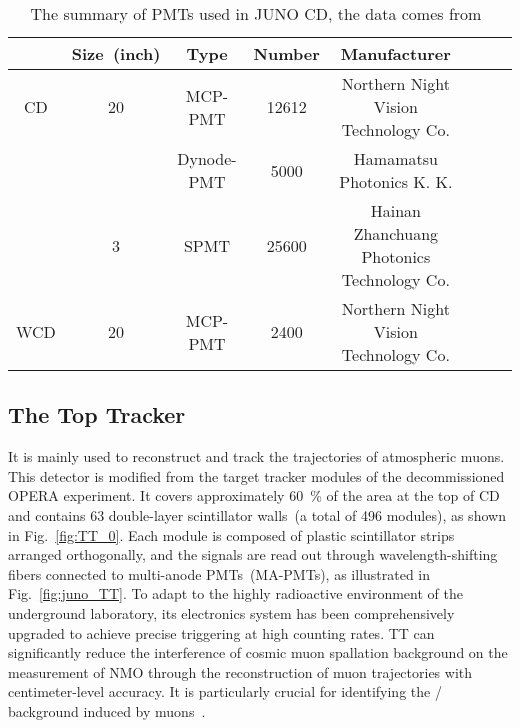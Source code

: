 \begin{table}[htbp]
	\centering %
	\caption{The summary of PMTs used in JUNO CD, the data comes from~\cite{muon207,PMT-3inch,JUNO:2022hlz}}
	\label{tab:juno_pmt}
	\begin{tabular}{cccccccc}
		\toprule %
		    & Size~(\si{inch}) & Type       & Number & Manufacturer                               \\
		\midrule %
		CD  & 20               & MCP-PMT    & 12612  & Northern Night Vision Technology Co.       \\
		    &                  & Dynode-PMT & 5000   & Hamamatsu Photonics K. K.                  \\
		    & 3                & SPMT       & 25600  & Hainan Zhanchuang Photonics Technology Co. \\
		WCD & 20               & MCP-PMT    & 2400   & Northern Night Vision Technology Co.       \\
		\bottomrule %
	\end{tabular}
\end{table}

\subsection{The Top Tracker}
It is mainly used to reconstruct and track the trajectories of atmospheric muons. This detector is modified from the target tracker modules of the decommissioned OPERA experiment. It covers approximately \SI{60}{\%} of the area at the top of CD and contains 63 double-layer scintillator walls~(a total of 496 modules), as shown in Fig.~\ref{fig:TT_0}. Each module is composed of plastic scintillator strips arranged orthogonally, and the signals are read out through wavelength-shifting fibers connected to multi-anode PMTs~(MA-PMTs), as illustrated in Fig.~\ref{fig:juno_TT}. To adapt to the highly radioactive environment of the underground laboratory, its electronics system has been comprehensively upgraded to achieve precise triggering at high counting rates. TT can significantly reduce the interference of cosmic muon spallation background on the measurement of NMO through the reconstruction of muon trajectories with centimeter-level accuracy. It is particularly crucial for identifying the / background induced by muons~\cite{top_tracker,muon207}.

